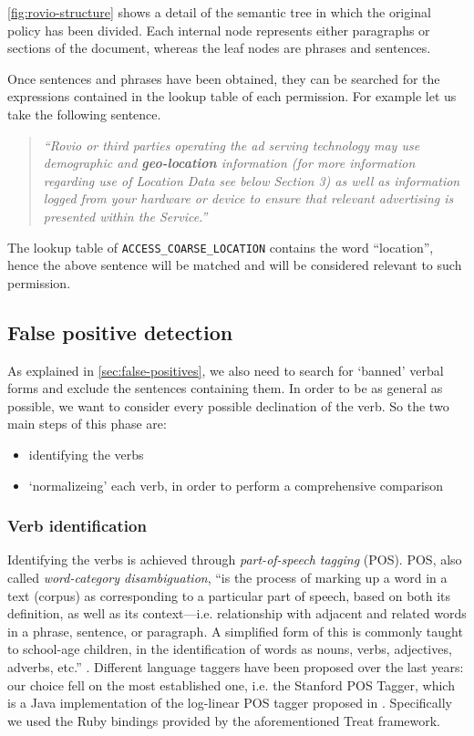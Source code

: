 \autoref{fig:rovio-structure} shows a detail of the semantic tree in which the original policy has been divided. Each internal node represents either paragraphs or sections of the document, whereas the leaf nodes are phrases and sentences.

Once sentences and phrases have been obtained, they can be searched for the expressions contained in the lookup table of each permission.
For example let us take the following sentence.

\begin{quote}
{\emph{``Rovio or third parties operating the ad serving technology may use demographic and \textbf{geo-location} information (for more information regarding use of Location Data see below Section 3) as well as information logged from your hardware or device to ensure that relevant advertising is presented within the Service.''}}\cite{rovio}
\end{quote}

The lookup table of \texttt{ACCESS\_COARSE\_LOCATION} contains the word ``location'', hence the above sentence will be matched and will be considered relevant to such permission.

\subsection{False positive detection}
As explained in \autoref{sec:false-positives}, we also need to search for `banned' verbal forms and exclude the sentences containing them. In order to be as general as possible, we want to consider every possible declination of the verb.
So the two main steps of this phase are:
\begin{itemize}
  \item identifying the verbs
  \item `normalizeing' each verb, in order to perform a comprehensive comparison
\end{itemize}

\subsubsection{Verb identification}
Identifying the verbs is achieved through \emph{part-of-speech tagging} (POS). POS, also called \emph{word-category disambiguation}, ``is the process of marking up a word in a text (corpus) as corresponding to a particular part of speech, based on both its definition, as well as its context—i.e. relationship with adjacent and related words in a phrase, sentence, or paragraph. A simplified form of this is commonly taught to school-age children, in the identification of words as nouns, verbs, adjectives, adverbs, etc.'' \cite{wiki:POS}. Different language taggers have been proposed over the last years: our choice fell on the most established one, i.e. the Stanford POS Tagger, which is a Java implementation of the log-linear POS tagger proposed in \cite{Toutanova:2003:FPT:1073445.1073478}.
Specifically we used the Ruby bindings provided by the aforementioned Treat framework.

